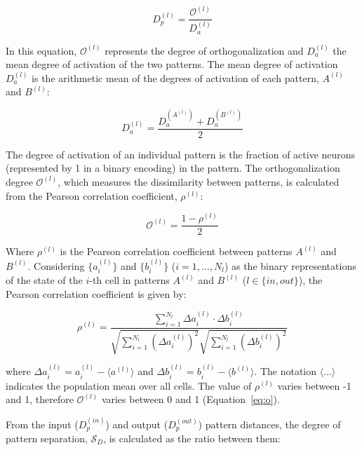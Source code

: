 \begin{equation}
    \label{eq:dp}
    D_p^{(l)} = \frac{\mathcal{O}^{(l)}}{D_a^{(l)}}
\end{equation}

In this equation, $\mathcal{O}^{(l)}$ represents the degree of orthogonalization and $D_a^{(l)}$ the mean degree of activation of the
two patterns. The mean degree of activation $D_a^{(l)}$ is the arithmetic mean of the degrees of activation of each pattern,
$A^{(l)}$ and $B^{(l)}$:

\begin{equation}
    \label{eq:da}
    D_a^{(l)} = \frac{D_a^{(A^{(l)})} + D_a^{(B^{(l)})}}{2}
\end{equation}

The degree of activation of an individual pattern is the fraction of active neurons (represented by 1 in a binary encoding) in
the pattern. The orthogonalization degree $\mathcal{O}^{(l)}$, which measures the dissimilarity between patterns, is calculated from the
Pearson correlation coefficient, $\rho^{(l)}$:

\begin{equation}
    \label{eq:o}
    \mathcal{O}^{(l)} = \frac{1 - \rho^{(l)}}{2}
\end{equation}

Where $\rho^{(l)}$ is the Pearson correlation coefficient between patterns $A^{(l)}$ and $B^{(l)}$.
Considering $\{a_i^{(l)}\}$ and $\{b_i^{(l)}\}$ ($i=1, \dots, N_l$) as the binary representations of the state of the
$i$-th cell in patterns $A^{(l)}$ and $B^{(l)}$ ($l \in \{in, out\}$), the Pearson correlation coefficient is given by:

\begin{equation}
    \label{eq:pearson}
    \rho^{(l)} = \frac{\sum_{i=1}^{N_l} \Delta a_i^{(l)} \cdot \Delta b_i^{(l)}}{\sqrt{\sum_{i=1}^{N_l} {(\Delta a_i^{(l)})}^2} \sqrt{\sum_{i=1}^{N_l} {(\Delta b_i^{(l)})}^2}}
\end{equation}

where $\Delta a_i^{(l)} = a_i^{(l)} - \langle a^{(l)} \rangle$ and $\Delta b_i^{(l)} = b_i^{(l)} - \langle b^{(l)} \rangle$.
The notation $\langle \dots \rangle$ indicates the population mean over all cells. The value of $\rho^{(l)}$ varies between
-1 and 1, therefore $\mathcal{O}^{(l)}$ varies between 0 and 1 (Equation~\ref{eq:o}).

From the input ($D_p^{(in)}$) and output ($D_p^{(out)}$) pattern distances, the degree of pattern separation,
$\mathcal{S}_D$, is calculated as the ratio between them:

